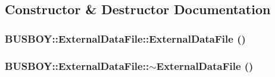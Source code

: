 \subsection{Constructor \& Destructor Documentation}
\hypertarget{classBUSBOY_1_1ExternalDataFile_a00c0baea9f35c3073ef36ecf96286860}{
\subsubsection[{ExternalDataFile}]{\setlength{\rightskip}{0pt plus 5cm}BUSBOY::ExternalDataFile::ExternalDataFile ()}}
\label{classBUSBOY_1_1ExternalDataFile_a00c0baea9f35c3073ef36ecf96286860}
\hypertarget{classBUSBOY_1_1ExternalDataFile_a1bcddcd6f8acbcc75e1c9698651a3e54}{
\subsubsection[{$\sim$ExternalDataFile}]{\setlength{\rightskip}{0pt plus 5cm}BUSBOY::ExternalDataFile::$\sim$ExternalDataFile ()}}
\label{classBUSBOY_1_1ExternalDataFile_a1bcddcd6f8acbcc75e1c9698651a3e54}


